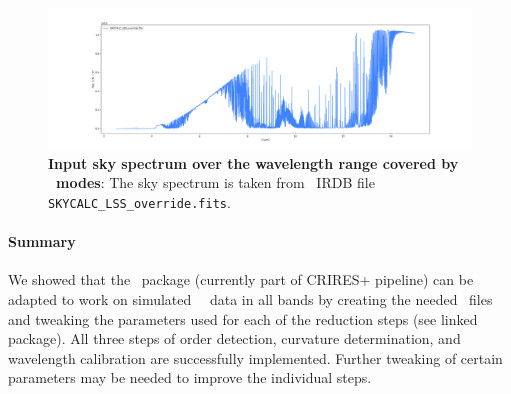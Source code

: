 \begin{figure}[!h]
  \centering
  \includegraphics[width=\textwidth]{figures/LSS_CrtAlg_files/SKYCALC_LSS_override.fits.png}
  \caption{\textbf{Input sky spectrum over the wavelength range covered by \met~\lss modes}: The sky spectrum is taken from \met~IRDB file \texttt{SKYCALC\_LSS\_override.fits}. }
  \label{fig:sky_spec}
\end{figure}




\paragraph{Summary}
We showed  that the \pyred~package (currently part of CRIRES+ pipeline) can be adapted to work on simulated \met~\lss~data in all bands by creating the needed \pyred~files and tweaking the parameters used for each of the reduction steps (see linked package). All three steps of order detection, curvature determination, and wavelength calibration are successfully implemented. Further tweaking of certain parameters may be needed to improve the individual steps.


